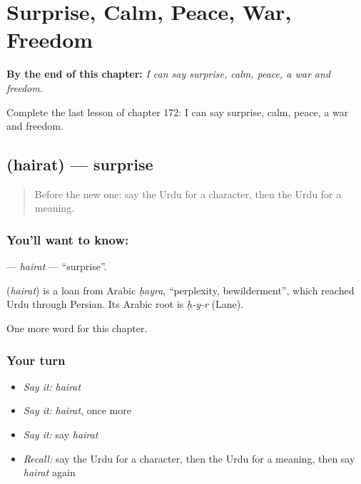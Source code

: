 
\chapter{Surprise, Calm, Peace, War, Freedom}
\label{ch:ur-surprise-calm-peace-war-freedom}

\begin{chapteropening}
\textbf{By the end of this chapter:} \emph{I can say surprise, calm, peace, a war and freedom.}

Complete the last lesson of chapter 172: I can say surprise, calm, peace, a war and freedom.
\end{chapteropening}

\section[\texorpdfstring{\ur{حیرت} (hairat)}{حیرت (hairat)}]{ (hairat) — surprise}

\label{lesson:UR-C172-hairat}



\begin{quote}
Before the new one: say the Urdu for a character, then the Urdu for a meaning.
\end{quote}

\subsection*{You'll want to know: }
\textbf{} — \emph{hairat} — \textquotedblleft{}surprise\textquotedblright{}.

\begin{cousinweb}
\textbf{} (\emph{hairat}) is a loan from Arabic \emph{ḥayra}, \textquotedblleft{}perplexity, bewilderment\textquotedblright{}, which reached Urdu through Persian. Its Arabic root is \emph{ḥ-y-r} (Lane).
\end{cousinweb}

\begin{grammarlens}[title={What you've built}]
One more word for this chapter.
\end{grammarlens}

\subsection*{Your turn}
\begin{itemize}
\raggedright
  \item \emph{Say it:} \emph{hairat}
  \item \emph{Say it:} \emph{hairat}, once more
  \item \emph{Say it:} say \emph{hairat}
  \item \emph{Recall:} say the Urdu for a character, then the Urdu for a meaning, then say \emph{hairat} again
\end{itemize}

